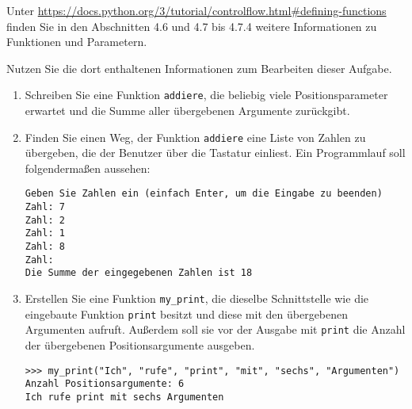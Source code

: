 Unter \href{https://docs.python.org/3/tutorial/controlflow.html\#defining-functions}{https://docs.python.org/3/tutorial/controlflow.html\#defining-functions} finden Sie in den Abschnitten 4.6 und 4.7 bis 4.7.4 weitere Informationen zu Funktionen und Parametern.

Nutzen Sie die dort enthaltenen Informationen zum Bearbeiten dieser Aufgabe.

\begin{enumerate}
    \item 
        Schreiben Sie eine Funktion \lstinline{addiere}, die beliebig viele Positionsparameter erwartet und die Summe aller übergebenen Argumente zurückgibt.
        
    \item
        Finden Sie einen Weg, der Funktion \lstinline{addiere} eine Liste von Zahlen zu übergeben, die der Benutzer über die Tastatur einliest. Ein Programmlauf soll folgendermaßen aussehen:
        \begin{lstlisting}
Geben Sie Zahlen ein (einfach Enter, um die Eingabe zu beenden)
Zahl: 7
Zahl: 2
Zahl: 1
Zahl: 8
Zahl:
Die Summe der eingegebenen Zahlen ist 18
        \end{lstlisting}

    \item
        Erstellen Sie eine Funktion \lstinline{my_print}, die dieselbe Schnittstelle wie die eingebaute Funktion \lstinline{print} besitzt und diese mit den übergebenen Argumenten aufruft. Außerdem soll sie vor der Ausgabe mit \lstinline{print} die Anzahl der übergebenen  Positionsargumente ausgeben.
        \begin{lstlisting}
>>> my_print("Ich", "rufe", "print", "mit", "sechs", "Argumenten")
Anzahl Positionsargumente: 6
Ich rufe print mit sechs Argumenten
        \end{lstlisting}
        

\end{enumerate}
